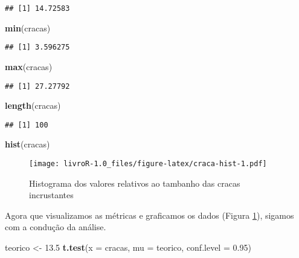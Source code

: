 \documentclass[titlepage, oneside, openany, a4paper]{book}
\newenvironment{Shaded}{\begin{snugshade}}{\end{snugshade}}
\newcommand{\DataTypeTok}[1]{\textcolor[rgb]{0.13,0.29,0.53}{#1}}
\newcommand{\FloatTok}[1]{\textcolor[rgb]{0.00,0.00,0.81}{#1}}
\newcommand{\KeywordTok}[1]{\textcolor[rgb]{0.13,0.29,0.53}{\textbf{#1}}}
\newcommand{\NormalTok}[1]{#1}
\newcommand{\StringTok}[1]{\textcolor[rgb]{0.31,0.60,0.02}{#1}}
\begin{document}
\begin{verbatim}
## [1] 14.72583
\end{verbatim}

\begin{Shaded}
\begin{Highlighting}[]
\KeywordTok{min}\NormalTok{(cracas)}
\end{Highlighting}
\end{Shaded}

\begin{verbatim}
## [1] 3.596275
\end{verbatim}

\begin{Shaded}
\begin{Highlighting}[]
\KeywordTok{max}\NormalTok{(cracas)}
\end{Highlighting}
\end{Shaded}

\begin{verbatim}
## [1] 27.27792
\end{verbatim}

\begin{Shaded}
\begin{Highlighting}[]
\KeywordTok{length}\NormalTok{(cracas)}
\end{Highlighting}
\end{Shaded}

\begin{verbatim}
## [1] 100
\end{verbatim}

\begin{Shaded}
\begin{Highlighting}[]
\KeywordTok{hist}\NormalTok{(cracas)}
\end{Highlighting}
\end{Shaded}

\begin{figure}
\centering
\texttt{[image: livroR-1.0\_files/figure-latex/craca-hist-1.pdf]}
\caption{\label{fig:craca-hist}Histograma dos valores relativos ao tambanho das cracas incrustantes}
\end{figure}

Agora que visualizamos as métricas e graficamos os dados (Figura \ref{fig:craca-hist}), sigamos com a condução da análise.

\begin{Shaded}
\begin{Highlighting}[]
\NormalTok{teorico <-}\StringTok{ }\FloatTok{13.5}
\KeywordTok{t.test}\NormalTok{(}\DataTypeTok{x =}\NormalTok{ cracas, }\DataTypeTok{mu =}\NormalTok{ teorico, }\DataTypeTok{conf.level =} \FloatTok{0.95}\NormalTok{)}
\end{Highlighting}
\end{Shaded}
\end{document}
